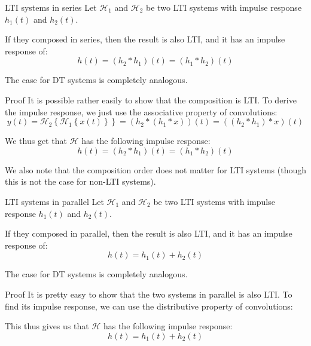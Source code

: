 \documentclass[a4paper]{article}
\begin{document}
\begin{parag}{LTI systems in series}
    Let $\mathcal{H}_1$ and $\mathcal{H}_2$ be two LTI systems with impulse response $h_1\left(t\right)$ and $h_2\left(t\right)$.

    If they composed in series, then the result is also LTI, and it has an impulse response of:
    \[h\left(t\right) = \left(h_2 * h_1\right)\left(t\right) = \left(h_1 * h_2\right)\left(t\right)\]

    The case for DT systems is completely analogous.

    \begin{subparag}{Proof}
        It is possible rather easily to show that the composition is LTI. To derive the impulse response, we just use the associative property of convolutions: 
        \[y\left(t\right) = \mathcal{H}_2\left\{\mathcal{H}_1\left\{x\left(t\right)\right\}\right\} = \left(h_2 *\left(h_1 * x\right)\right)\left(t\right) = \left(\left(h_2 * h_1\right)* x\right)\left(t\right)\]
        
        We thus get that $\mathcal{H}$ has the following impulse response: 
        \[h\left(t\right) = \left(h_2 * h_1\right)\left(t\right) = \left(h_1 * h_2\right)\left(t\right)\]
        
        We also note that the composition order does not matter for LTI systems (though this is not the case for non-LTI systems). 
    \end{subparag}
\end{parag}

\begin{parag}{LTI systems in parallel}
    Let $\mathcal{H}_1$ and $\mathcal{H}_2$ be two LTI systems with impulse response $h_1\left(t\right)$ and $h_2\left(t\right)$.

    If they composed in parallel, then the result is also LTI, and it has an impulse response of:
    \[h\left(t\right) = h_1\left(t\right) + h_2\left(t\right)\]

    The case for DT systems is completely analogous.

    \begin{subparag}{Proof}
        It is pretty easy to show that the two systems in parallel is also LTI. To find its impulse response, we can use the distributive property of convolutions: 

        This thus gives us that $\mathcal{H}$ has the following impulse response: 
        \[h\left(t\right) = h_1\left(t\right) + h_2\left(t\right)\]
    \end{subparag}
\end{parag}
\end{document}
